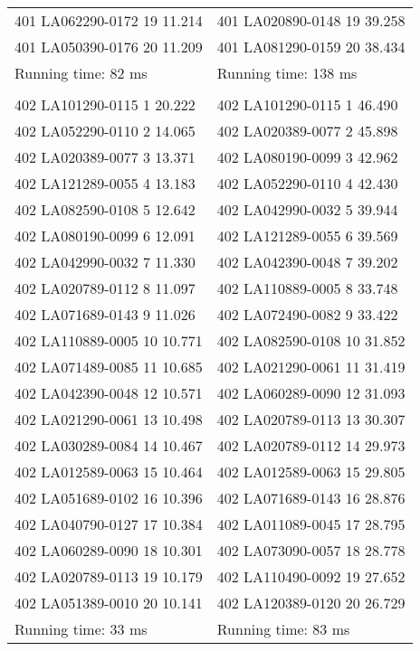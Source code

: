 \begin{tabular}{ l l }
401 LA062290-0172 19 11.214 & 401 LA020890-0148 19 39.258\\
401 LA050390-0176 20 11.209 & 401 LA081290-0159 20 38.434\\
Running time: 82 ms & Running time: 138 ms\\
\\
402 LA101290-0115 1 20.222 & 402 LA101290-0115 1 46.490\\
402 LA052290-0110 2 14.065 & 402 LA020389-0077 2 45.898\\
402 LA020389-0077 3 13.371 & 402 LA080190-0099 3 42.962\\
402 LA121289-0055 4 13.183 & 402 LA052290-0110 4 42.430\\
402 LA082590-0108 5 12.642 & 402 LA042990-0032 5 39.944\\
402 LA080190-0099 6 12.091 & 402 LA121289-0055 6 39.569\\
402 LA042990-0032 7 11.330 & 402 LA042390-0048 7 39.202\\
402 LA020789-0112 8 11.097 & 402 LA110889-0005 8 33.748\\
402 LA071689-0143 9 11.026 & 402 LA072490-0082 9 33.422\\
402 LA110889-0005 10 10.771 & 402 LA082590-0108 10 31.852\\
402 LA071489-0085 11 10.685 & 402 LA021290-0061 11 31.419\\
402 LA042390-0048 12 10.571 & 402 LA060289-0090 12 31.093\\
402 LA021290-0061 13 10.498 & 402 LA020789-0113 13 30.307\\
402 LA030289-0084 14 10.467 & 402 LA020789-0112 14 29.973\\
402 LA012589-0063 15 10.464 & 402 LA012589-0063 15 29.805\\
402 LA051689-0102 16 10.396 & 402 LA071689-0143 16 28.876\\
402 LA040790-0127 17 10.384 & 402 LA011089-0045 17 28.795\\
402 LA060289-0090 18 10.301 & 402 LA073090-0057 18 28.778\\
402 LA020789-0113 19 10.179 & 402 LA110490-0092 19 27.652\\
402 LA051389-0010 20 10.141 & 402 LA120389-0120 20 26.729\\
Running time: 33 ms & Running time: 83 ms
\end{tabular}
\newpage
